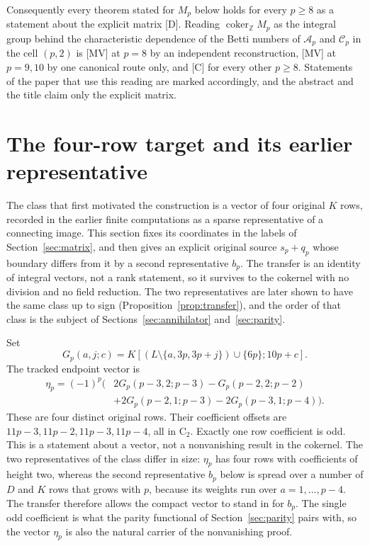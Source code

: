 \documentclass[11pt]{article}
\theoremstyle{definition}
\theoremstyle{remark}
\newcommand{\Z}{\mathbb Z}
\begin{document}
Consequently every theorem stated for $M_p$ below holds for every $p\geq8$ as a
statement about the explicit matrix [D]. Reading $\operatorname{coker}_{\Z}M_p$ as
the integral group behind the characteristic dependence of the Betti numbers of
$\mathcal A_p$ and $\mathcal C_p$ in the cell $(p,2)$ is [MV] at $p=8$ by an independent
reconstruction, [MV] at $p=9,10$ by one canonical route only, and
[C] for every other $p\geq8$. Statements of the paper that use this reading are
marked accordingly, and the abstract and the title claim only the explicit
matrix.

\section{The four-row target and its earlier representative}\label{sec:eta}

The class that first motivated the construction is a vector of four original
$K$ rows, recorded in the earlier finite computations as a sparse
representative of a connecting image. This section fixes its coordinates in the
labels of Section~\ref{sec:matrix}, and then gives an explicit original source
$s_p+q_p$ whose boundary differs from it by a second representative $b_p$. The
transfer is an identity of integral vectors, not a rank statement, so it
survives to the cokernel with no division and no field reduction. The two
representatives are later shown to have the same class up to sign
(Proposition~\ref{prop:transfer}), and the order of that class is the subject of
Sections~\ref{sec:annihilator} and~\ref{sec:parity}.

Set
\[
 G_p(a,j;c)=K[(L\setminus\{a,3p,3p+j\})\cup\{6p\};10p+c].
\]
The tracked endpoint vector is
\begin{equation}\label{eq:eta}
 \begin{split}
 \eta_p=(-1)^p\bigl(&2G_p(p-3,2;p-3)-G_p(p-2,2;p-2)\\
                  &+2G_p(p-2,1;p-3)-2G_p(p-3,1;p-4)\bigr).
 \end{split}
\end{equation}
These are four distinct original rows. Their coefficient offsets are
$11p-3,11p-2,11p-3,11p-4$, all in $\mathrm C_2$.
Exactly one row coefficient is odd. This is a statement about a vector,
not a nonvanishing result in the cokernel. The two representatives of the class
differ in size: $\eta_p$ has four rows with coefficients of height two, whereas
the second representative $b_p$ below is spread over a number of $D$ and $K$ rows that
grows with $p$, because its weights run over $a=1,\ldots,p-4$. The transfer
therefore allows the compact vector to stand in for $b_p$. The single odd
coefficient is what the parity functional of Section~\ref{sec:parity} pairs with, so
the vector $\eta_p$ is also the natural carrier of the nonvanishing proof.
\end{document}
